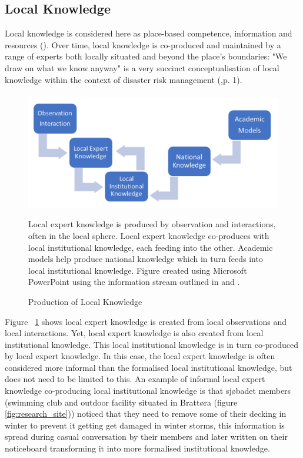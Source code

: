 \subsection{Local Knowledge}

Local knowledge is considered here as place-based competence, information and resources (\cite{setten_we_2019}). Over time,  local knowledge is co-produced and maintained by a range of experts both locally situated and beyond the place's boundaries: "We draw on what we know anyway" is a very succinct conceptualisation of local knowledge within the context of disaster risk management (\cite{setten_we_2019},p. 1). 
\paragraph{}

\begin{figure}[ht]
    \centering
    \includegraphics[width=1\textwidth]{fig_theory/local knowledge accumulation.png}
    \caption{Production of Local Knowledge }{ Local expert knowledge is produced by observation and interactions, often in the local sphere. Local expert knowledge co-produces with local institutional knowledge, each feeding into the other. Academic models help produce national knowledge which in turn feeds into local institutional knowledge. Figure created using Microsoft PowerPoint using the information stream outlined in \cite{setten_we_2019} and \cite{rod_integrated_2012}.}
    \label{fig:local_knowledge}
\end{figure}


Figure ~\ref{fig:local_knowledge} shows local expert knowledge is created from local observations and local interactions. Yet, local expert knowledge is also created from local institutional knowledge. This local institutional knowledge is in turn co-produced by local expert knowledge. In this case, the local expert knowledge is often considered more informal than the formalised local institutional knowledge, but does not need to be limited to this. An example of informal local expert knowledge co-producing local institutional knowledge is that sjøbadet members (swimming club and outdoor facility situated in Brattøra (figure \ref{fig:research_site})) noticed that they need to remove some of their decking in winter to prevent it getting get damaged in winter storms, this information is spread during casual conversation by their members and later written on their noticeboard transforming it into more formalised institutional knowledge. 
